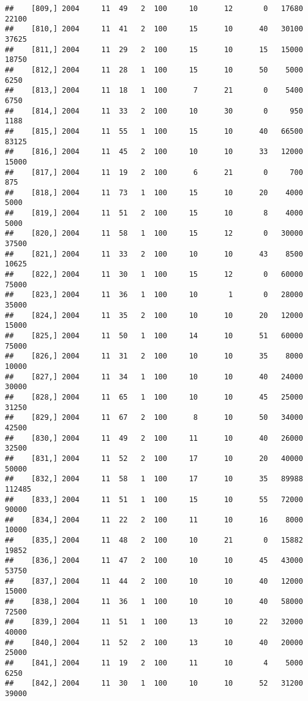 \documentclass{article}\usepackage[]{graphicx}\usepackage[]{color}
\makeatletter
\newenvironment{kframe}{%
 \def\at@end@of@kframe{}%
 \ifinner\ifhmode%
  \def\at@end@of@kframe{\end{minipage}}%
  \begin{minipage}{\columnwidth}%
 \fi\fi%
 \def\FrameCommand##1{\hskip\@totalleftmargin \hskip-\fboxsep
 \colorbox{shadecolor}{##1}\hskip-\fboxsep
     \hskip-\linewidth \hskip-\@totalleftmargin \hskip\columnwidth}%
 \MakeFramed {\advance\hsize-\width
   \@totalleftmargin\z@ \linewidth\hsize
   \@setminipage}}%
 {\par\unskip\endMakeFramed%
 \at@end@of@kframe}
\newenvironment{knitrout}{}{} %
\makeatother
\begin{document}
\begin{knitrout}
\begin{kframe}
\begin{verbatim}
##    [809,] 2004     11  49   2  100     10      12       0   17680   22100
##    [810,] 2004     11  41   2  100     15      10      40   30100   37625
##    [811,] 2004     11  29   2  100     15      10      15   15000   18750
##    [812,] 2004     11  28   1  100     15      10      50    5000    6250
##    [813,] 2004     11  18   1  100      7      21       0    5400    6750
##    [814,] 2004     11  33   2  100     10      30       0     950    1188
##    [815,] 2004     11  55   1  100     15      10      40   66500   83125
##    [816,] 2004     11  45   2  100     10      10      33   12000   15000
##    [817,] 2004     11  19   2  100      6      21       0     700     875
##    [818,] 2004     11  73   1  100     15      10      20    4000    5000
##    [819,] 2004     11  51   2  100     15      10       8    4000    5000
##    [820,] 2004     11  58   1  100     15      12       0   30000   37500
##    [821,] 2004     11  33   2  100     10      10      43    8500   10625
##    [822,] 2004     11  30   1  100     15      12       0   60000   75000
##    [823,] 2004     11  36   1  100     10       1       0   28000   35000
##    [824,] 2004     11  35   2  100     10      10      20   12000   15000
##    [825,] 2004     11  50   1  100     14      10      51   60000   75000
##    [826,] 2004     11  31   2  100     10      10      35    8000   10000
##    [827,] 2004     11  34   1  100     10      10      40   24000   30000
##    [828,] 2004     11  65   1  100     10      10      45   25000   31250
##    [829,] 2004     11  67   2  100      8      10      50   34000   42500
##    [830,] 2004     11  49   2  100     11      10      40   26000   32500
##    [831,] 2004     11  52   2  100     17      10      20   40000   50000
##    [832,] 2004     11  58   1  100     17      10      35   89988  112485
##    [833,] 2004     11  51   1  100     15      10      55   72000   90000
##    [834,] 2004     11  22   2  100     11      10      16    8000   10000
##    [835,] 2004     11  48   2  100     10      21       0   15882   19852
##    [836,] 2004     11  47   2  100     10      10      45   43000   53750
##    [837,] 2004     11  44   2  100     10      10      40   12000   15000
##    [838,] 2004     11  36   1  100     10      10      40   58000   72500
##    [839,] 2004     11  51   1  100     13      10      22   32000   40000
##    [840,] 2004     11  52   2  100     13      10      40   20000   25000
##    [841,] 2004     11  19   2  100     11      10       4    5000    6250
##    [842,] 2004     11  30   1  100     10      10      52   31200   39000

\end{verbatim}
\end{kframe}
\end{knitrout}
\end{document}
